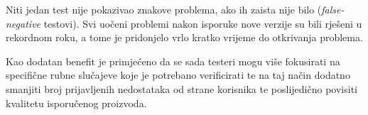 Niti jedan test nije pokazivao znakove problema, ako ih zaista nije bilo (\emph{false-negative} testovi).
Svi uočeni problemi nakon isporuke nove verzije su bili rješeni u rekordnom roku, a tome je pridonjelo vrlo kratko vrijeme do otkrivanja problema.

Kao dodatan benefit je primjećeno da se sada testeri mogu više fokusirati na specifične rubne slučajeve koje je potrebano verificirati te na taj način dodatno smanjiti broj prijavljenih nedostataka od strane korisnika te poslijedično povisiti kvalitetu isporučenog proizvoda.
